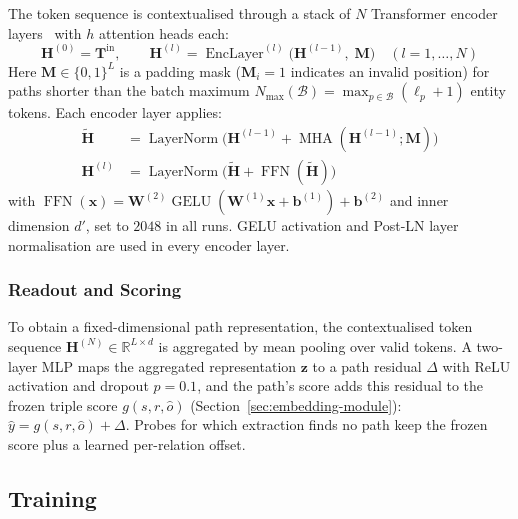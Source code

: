 \documentclass[runningheads]{llncs}
\begin{document}
The token sequence is contextualised through a stack of $N$
Transformer encoder layers~\cite{vaswani2017attention} with $h$ attention heads each:
\begin{equation}
  \mathbf{H}^{(0)} = \mathbf{T}^{\text{in}},\qquad
  \mathbf{H}^{(l)} = \operatorname{EncLayer}^{(l)}\bigl(\mathbf{H}^{(l-1)},\; \mathbf{M}\bigr)
  \quad (l = 1, \ldots, N)
  \label{eq:transformer}
\end{equation}
Here $\mathbf{M} \in \{0, 1\}^{L}$ is a padding mask ($\mathbf{M}_i = 1$ indicates an
invalid position) for paths shorter than the batch maximum
$N_{\max}(\mathcal{B}) = \max_{p \in \mathcal{B}}(\ell_p + 1)$ entity
tokens.
Each encoder layer applies:
\begin{align}
  \tilde{\mathbf{H}} &= \operatorname{LayerNorm}\bigl(
  \mathbf{H}^{(l-1)} + \operatorname{MHA}(\mathbf{H}^{(l-1)}; \mathbf{M})\bigr)
  \label{eq:attn}\\
  \mathbf{H}^{(l)} &= \operatorname{LayerNorm}\bigl(
  \tilde{\mathbf{H}} + \operatorname{FFN}(\tilde{\mathbf{H}})\bigr)
  \label{eq:ffn}
\end{align}
with $\operatorname{FFN}(\mathbf{x}) = \mathbf{W}^{(2)} \operatorname{GELU}(\mathbf{W}^{(1)} \mathbf{x} + \mathbf{b}^{(1)}) + \mathbf{b}^{(2)}$
and inner dimension $d'$, set to $2048$ in all runs.
GELU \cite{hendrycks2016gaussian} activation
and Post-LN layer normalisation are used in every encoder layer.

\subsubsection{Readout and Scoring}

\label{sec:readout}

To obtain a fixed-dimensional path representation, the contextualised
token sequence $\mathbf{H}^{(N)} \in \mathbb{R}^{L \times d}$ is
aggregated by mean pooling over valid tokens. A two-layer MLP maps the
aggregated representation $\mathbf{z}$ to a path residual $\Delta$ with
ReLU activation and dropout $p = 0.1$, and the path's score adds this
residual to the frozen triple score $g(s, r, \hat{o})$
(Section~\ref{sec:embedding-module}):
$\hat{y} = g(s, r, \hat{o}) + \Delta$.
Probes for which extraction finds no path keep the frozen score plus a
learned per-relation offset.

\subsection{Training}
\end{document}
